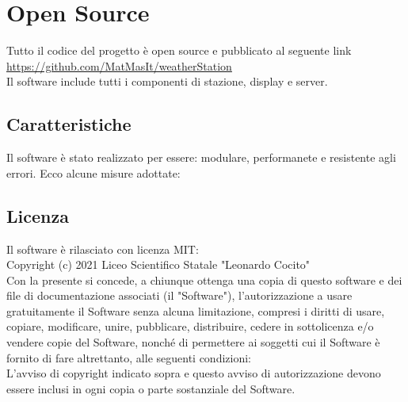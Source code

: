 \documentclass{article}
\begin{document}
\section{Open Source}
Tutto il codice del progetto è open source e pubblicato al seguente link\\
\url{https://github.com/MatMasIt/weatherStation}\\
Il software include tutti i componenti di stazione, display e server.
\subsection{Caratteristiche}
Il software è stato realizzato per essere: modulare, performanete e resistente agli errori.
Ecco alcune misure adottate:
\subsection{Licenza}
Il software è rilasciato con licenza MIT:\\
Copyright (c) 2021 Liceo Scientifico Statale "Leonardo Cocito"\\

Con la presente si concede, a chiunque ottenga una copia di questo software e dei file di documentazione associati (il "Software"), l'autorizzazione a usare gratuitamente il Software senza alcuna limitazione, compresi i diritti di usare, copiare, modificare, unire, pubblicare, distribuire, cedere in sottolicenza e/o vendere copie del Software, nonché di permettere ai soggetti cui il Software è fornito di fare altrettanto, alle seguenti condizioni:\\

L'avviso di copyright indicato sopra e questo avviso di autorizzazione devono essere inclusi in ogni copia o parte sostanziale del Software.\\
\end{document}
